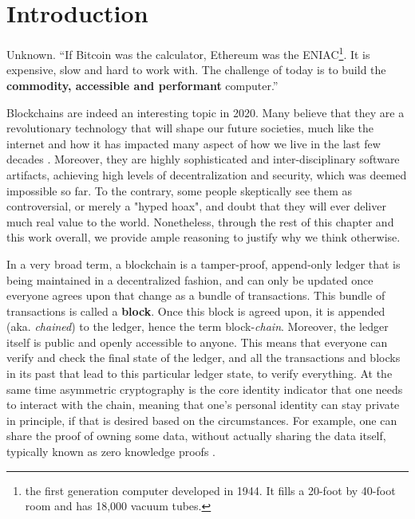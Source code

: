 \chapter{Introduction} \label{chap:intoroduction}

\ifpdf
    \graphicspath{{1_introduction/figures/PNG/}{1_introduction/figures/PDF/}{1_introduction/figures/}}
\else
    \graphicspath{{1_introduction/figures/EPS/}{1_introduction/figures/}}
\fi

\begin{chapquote}{Unknown.}
``If Bitcoin was the calculator, Ethereum was the ENIAC\footnote{the first generation computer
developed in 1944. It fills a 20-foot by 40-foot room and has 18,000 vacuum tubes.}. It is
expensive, slow and hard to work with. The challenge of today is to build the \textbf{commodity,
accessible and performant} computer.''
\end{chapquote}


Blockchains are indeed an interesting topic in 2020. Many believe that they are a revolutionary
technology that will shape our future societies, much like the internet and how it has impacted many
aspect of how we live in the last few decades \cite{will_blockchain_be_big_deal}. Moreover, they are
highly sophisticated and inter-disciplinary software artifacts, achieving high levels of
decentralization and security, which was deemed impossible so far. To the contrary, some people
skeptically see them as controversial, or merely a "hyped hoax", and doubt that they will ever
deliver much real value to the world. Nonetheless, through the rest of this chapter and this work overall, we provide ample reasoning to justify why we think otherwise. 

In a very broad term, a blockchain is a tamper-proof, append-only ledger that is being maintained in
a decentralized fashion, and can only be updated once everyone agrees upon that change as a bundle
of transactions. This bundle of transactions is called a \textbf{block}. Once this block is agreed
upon, it is appended (aka. \textit{chained}) to the ledger, hence the term block-\textit{chain}.
Moreover, the ledger itself is public and openly accessible to anyone. This means that everyone can
verify and check the final state of the ledger, and all the transactions and blocks in its past that
lead to this particular ledger state, to verify everything. At the same time asymmetric cryptography
is the core identity indicator that one needs to interact with the chain, meaning that one's personal
identity can stay private in principle, if that is desired based on the circumstances. For example, one can share the proof of owning some data, without actually sharing the data itself, typically known as zero knowledge proofs \cite{Goldreich_Oren_1994_ZK}.

